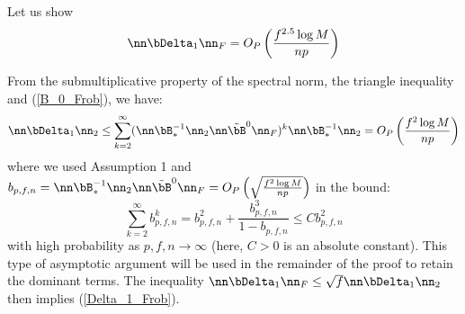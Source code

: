 \begin{IEEEproof}
Let us show
\begin{equation} \label{Delta_1_Frob}
	\nn \bDelta_1 \nn_F = O_P\left( \frac{f^{2.5} \log M}{np} \right)
\end{equation}

From the submultiplicative property of the spectral norm, the triangle inequality and (\ref{B_0_Frob}), we have:
\begin{equation*}
	\nn \bDelta_1 \nn_2 \leq \sum_{k=2}^\infty (\nn \bB_*^{-1} \nn_2 \nn \tilde{\bB}^0 \nn_F)^k \nn \bB_*^{-1} \nn_2 = O_P\left( \frac{f^2 \log M}{np} \right)
\end{equation*}
where we used Assumption 1 and $b_{p,f,n}= \nn \bB_*^{-1} \nn_2 \nn \tilde{\bB}^0 \nn_F=O_P\left(  \sqrt{\frac{f^2 \log M}{np}} \right)$ in the bound:
\begin{equation*}
	\sum_{k=2}^\infty b_{p,f,n}^k = b_{p,f,n}^2 + \frac{b_{p,f,n}^3}{1-b_{p,f,n}} \leq C b_{p,f,n}^2
\end{equation*}
with high probability as $p,f,n\to\infty$ (here, $C>0$ is an absolute constant). This type of asymptotic argument will be used in the remainder of the proof to retain the dominant terms. The inequality $\nn \bDelta_1 \nn_F \leq \sqrt{f} \nn \bDelta_1 \nn_2$ then implies (\ref{Delta_1_Frob}).



\end{IEEEproof}
